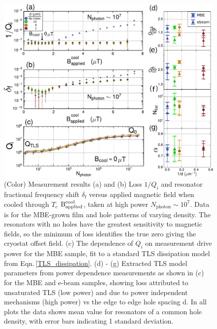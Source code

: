 \documentclass{report}
\begin{document}
\begin{figure}
\begin{center}

\includegraphics[width=400 pt]{DielectricFluxTrap_ExpData_arxiv_Rev2c_proof_revision1.pdf}

\end{center}
\caption{(Color) Measurement results  (a) and (b) Loss $1/Q_i$ and resonator fractional frequency shift $\delta_{\textrm{f}}$ versus applied magnetic field when cooled through $T_c$ $\text{B}^{\text{cool}}_{\text{applied}}$, taken at high power $N_\textrm{photon} \sim 10^7$.  Data is for the MBE-grown film and hole patterns of varying density.  The resonators with no holes have the greatest sensitivity to magnetic fields, so the minimum of loss identifies the true zero giving the cryostat offset field.  (c) The dependence of $Q_i$ on measurement drive power for the MBE sample, fit to a standard TLS dissipation model from Eqn.\,\ref{TLS_dissipation}.  (d) - (g) Extracted TLS model parameters from power dependence measurements as shown in (c) for the MBE and e-beam samples, showing loss attributed to unsaturated TLS (low power) and due to power independent mechanisms (high power) vs the edge to edge hole spacing d.  In all plots the data shows mean value for resonators of a common hole density, with error bars indicating 1 standard deviation.}
\label{Resonator Measurements}
\end{figure}
\end{document}
